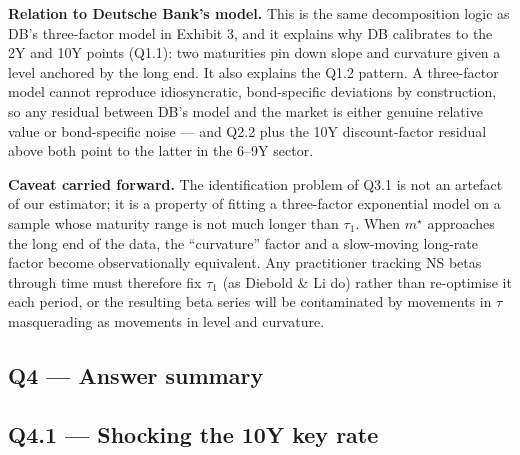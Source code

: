 \documentclass[11pt]{article}
\newcommand{\question}[1]{\subsection*{\textcolor{edhecred}{#1}}}
\begin{document}
\textbf{Relation to Deutsche Bank's model.} This is the same decomposition logic as DB's
three-factor model in Exhibit 3, and it explains why DB calibrates to the 2Y and 10Y points
(Q1.1): two maturities pin down slope and curvature given a level anchored by the long end. It also
explains the Q1.2 pattern. A three-factor model cannot reproduce idiosyncratic, bond-specific
deviations by construction, so any residual between DB's model and the market is either genuine
relative value or bond-specific noise --- and Q2.2 plus the 10Y discount-factor residual above both
point to the latter in the 6--9Y sector.
 
\textbf{Caveat carried forward.} The identification problem of Q3.1 is not an artefact of our
estimator; it is a property of fitting a three-factor exponential model on a sample whose maturity
range is not much longer than $\tau_1$. When $m^\star$ approaches the long end of the data, the
``curvature'' factor and a slow-moving long-rate factor become observationally equivalent. Any
practitioner tracking NS betas through time must therefore fix $\tau_1$ (as Diebold \& Li do) rather
than re-optimise it each period, or the resulting beta series will be contaminated by movements in
$\tau$ masquerading as movements in level and curvature.
 
\question{Q4 --- Answer summary}

\begin{center}
\end{center}

\question{Q4.1 --- Shocking the 10Y key rate}
\end{document}

